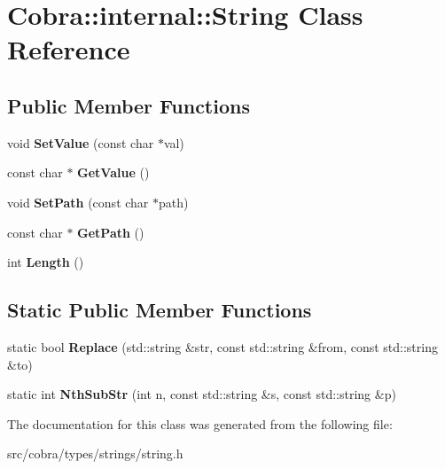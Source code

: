 \hypertarget{class_cobra_1_1internal_1_1_string}{\section{Cobra\+:\+:internal\+:\+:String Class Reference}
\label{class_cobra_1_1internal_1_1_string}
}
\subsection*{Public Member Functions}
\begin{DoxyCompactItemize}
\item 
\hypertarget{class_cobra_1_1internal_1_1_string_a3b71e1d8e3fa402e5b5f9c003438ca22}{void {\bfseries Set\+Value} (const char $\ast$val)}\label{class_cobra_1_1internal_1_1_string_a3b71e1d8e3fa402e5b5f9c003438ca22}

\item 
\hypertarget{class_cobra_1_1internal_1_1_string_a728f1e162a43a7b3c7261b477de7d197}{const char $\ast$ {\bfseries Get\+Value} ()}\label{class_cobra_1_1internal_1_1_string_a728f1e162a43a7b3c7261b477de7d197}

\item 
\hypertarget{class_cobra_1_1internal_1_1_string_af051b388ccb8fbd0816062bbce072507}{void {\bfseries Set\+Path} (const char $\ast$path)}\label{class_cobra_1_1internal_1_1_string_af051b388ccb8fbd0816062bbce072507}

\item 
\hypertarget{class_cobra_1_1internal_1_1_string_ade3cf71da3c0c32ebfd076e12b1d21bf}{const char $\ast$ {\bfseries Get\+Path} ()}\label{class_cobra_1_1internal_1_1_string_ade3cf71da3c0c32ebfd076e12b1d21bf}

\item 
\hypertarget{class_cobra_1_1internal_1_1_string_ad2f8be7ec1cff02df6982b734c5f5c57}{int {\bfseries Length} ()}\label{class_cobra_1_1internal_1_1_string_ad2f8be7ec1cff02df6982b734c5f5c57}

\end{DoxyCompactItemize}
\subsection*{Static Public Member Functions}
\begin{DoxyCompactItemize}
\item 
\hypertarget{class_cobra_1_1internal_1_1_string_a62d4dad8e651db9182256022626c4f6f}{static bool {\bfseries Replace} (std\+::string \&str, const std\+::string \&from, const std\+::string \&to)}\label{class_cobra_1_1internal_1_1_string_a62d4dad8e651db9182256022626c4f6f}

\item 
\hypertarget{class_cobra_1_1internal_1_1_string_aaf3372d25e7229f40a6b7473616dff62}{static int {\bfseries Nth\+Sub\+Str} (int n, const std\+::string \&s, const std\+::string \&p)}\label{class_cobra_1_1internal_1_1_string_aaf3372d25e7229f40a6b7473616dff62}

\end{DoxyCompactItemize}


The documentation for this class was generated from the following file\+:\begin{DoxyCompactItemize}
\item 
src/cobra/types/strings/string.\+h\end{DoxyCompactItemize}
